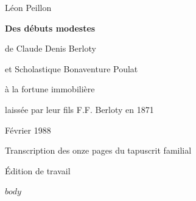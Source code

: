 \documentclass[11pt,a4paper]{report}
\providecommand{\releaseversion}{Édition de travail}
\begin{document}
\begin{titlepage}
\centering
\vspace*{1.8cm}
{\Large Léon Peillon\par}
\vspace{1.8cm}
{\LARGE\bfseries Des débuts modestes\par}
\vspace{0.6cm}
{\Large de Claude Denis Berloty\par et Scholastique Bonaventure Poulat\par}
\vspace{0.8cm}
{\Large à la fortune immobilière\par laissée par leur fils F.F. Berloty en 1871\par}
\vfill
{\large Février 1988\par}
\vspace{1cm}
{\small Transcription des onze pages du tapuscrit familial\par}
{\small \releaseversion\par}
\end{titlepage}
\tableofcontents
\clearpage
$body$
\end{document}

